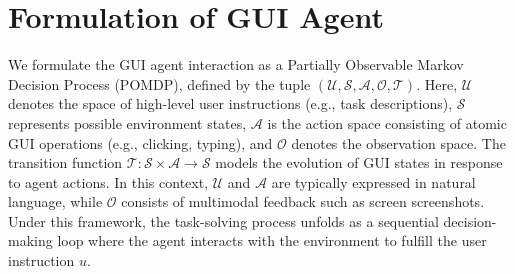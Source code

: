 \documentclass{llmxive}
\providecommand{\lilei}[1]{#1 -lilei}
\begin{document}
\section{Formulation of GUI Agent}
\label{sec: task formation}



We formulate the GUI agent interaction as a Partially Observable Markov Decision Process (POMDP), defined by the tuple $(\mathcal{U}, \mathcal{S}, \mathcal{A}, \mathcal{O}, \mathcal{T})$. 
Here, $\mathcal{U}$ denotes the space of high-level user instructions (e.g., task descriptions), $\mathcal{S}$ represents possible environment states, $\mathcal{A}$ is the action space consisting of atomic GUI operations (e.g., clicking, typing), and $\mathcal{O}$ denotes the observation space. 
The transition function $\mathcal{T}: \mathcal{S} \times \mathcal{A} \rightarrow \mathcal{S}$ models the evolution of GUI states in response to agent actions. 
In this context, $\mathcal{U}$ and $\mathcal{A}$ are typically expressed in natural language, while $\mathcal{O}$ consists of multimodal feedback such as screen screenshots. 
Under this framework, the task-solving process unfolds as a sequential decision-making loop where the agent interacts with the environment to fulfill the user instruction $u$.
\end{document}
